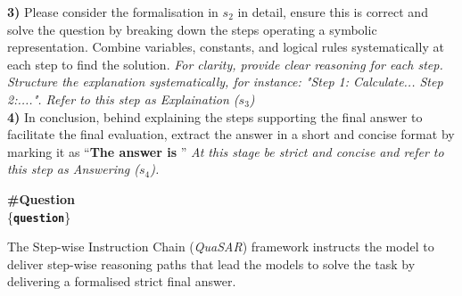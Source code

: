 \documentclass[11pt]{article}
\newcommand{\QuaSAR}{\emph{QuaSAR}\xspace}
\begin{document}
\begin{table*}
\begin{small}
\begin{tcolorbox}[colback=lightgray, colframe=customisedblue, sharp corners=south, rounded corners=north]
\begin{tcolorbox}[colback=white, colframe=customisedblue, rounded corners=south, rounded corners=north]
\begin{adjustwidth}{0.5cm}{0cm}
    \textbf{3)} Please consider the formalisation in \textcolor{customisedblue}{$s_2$} in detail, ensure this is correct and solve the question by breaking down the steps operating a symbolic representation. Combine variables, constants, and logical rules systematically at each step to find the solution.
    \textit{For clarity, provide clear reasoning for each step. Structure the explanation systematically, for instance: "Step 1: Calculate... Step 2:....". Refer to this step as \textcolor{customisedblue}{Explaination ($s_3$)}} \\
    
    \textbf{4)} In conclusion, behind explaining the steps supporting the final answer to facilitate the final evaluation, extract the answer in a short and concise format by marking it as “\textbf{The answer is }” \textit{At this stage be strict and concise and refer to this step as \textcolor{customisedblue}{Answering ($s_4$).}}
\end{adjustwidth}
    
\end{tcolorbox}

\begin{tcolorbox}[colback=white, colframe=customisedblue, rounded corners=south, rounded corners=north]
\textbf{\#Question} \\
\{\texttt{\textbf{question}}\}
\end{tcolorbox}

\end{tcolorbox}
\end{small}
\caption{The Step-wise Instruction Chain (\QuaSAR) framework instructs the model to deliver step-wise reasoning paths that lead the models to solve the task by delivering a formalised strict final answer.}
\label{tab:prompt_SiC}

\end{table*}
\end{document}
